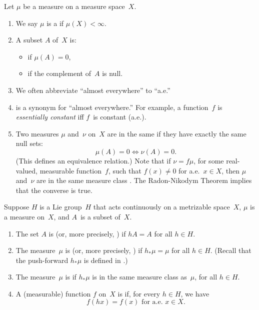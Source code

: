 \begin{defns}
Let $\mu$ be a measure on a measure space~$X$.
\noprelistbreak
	\begin{enumerate}
	\item We say $\mu$ is a  if $\mu(X) < \infty$.
	\item A subset $A$ of~$X$ is:
		\begin{itemize}
		\item {} if $\mu(A) = 0$,
		\item {} if the complement of~$A$ is null.
		\end{itemize}
	\item We often abbreviate ``almost everywhere'' to ``a.e\zz.''
	\item {} is a synonym for ``almost everywhere\zz.'' For example, a function~$f$ is \emph{essentially constant} iff $f$~is constant (a.e.).
	\item Two measures $\mu$ and~$\nu$ on~$X$ are in the same 
if they have exactly the same null sets:
		$$ \mu(A) = 0 \iff \nu(A) = 0 .$$
	(This defines an equivalence relation.) Note that if $\nu = f \mu$, for some real-valued, measurable function~$f$, such that $f(x) \neq 0$ for a.e.\ $x \in X$, then $\mu$ and~$\nu$ are in the same measure class . 
The Radon-Nikodym Theorem  implies that the converse is true.
	\end{enumerate}
\end{defns}

\begin{defns}
Suppose $H$ is a Lie group~$H$ that acts continuously on a metrizable space~$X$, $\mu$ is a measure on~$X$, and $A$~is a subset of~$X$.
	\begin{enumerate}
	\item The set $A$ is  (or, more precisely, ) if $hA = A$ for all $h \in H$.
	\item The measure~$\mu$ is  (or, more precisely, ) if $h_*\mu = \mu$ for all $h \in H$. (Recall that the push-forward $h_*\mu$ is defined in .)
	\item The measure~$\mu$ is  if $h_*\mu$ is in the same measure class as~$\mu$, for all $h \in H$.
	\item A (measurable) function $f$ on~$X$ is  if, for every $h \in H$, we have
	$$ \text{$f(hx) = f(x)$ for a.e.\ $x \in X$.} $$
	\end{enumerate}
\end{defns}

